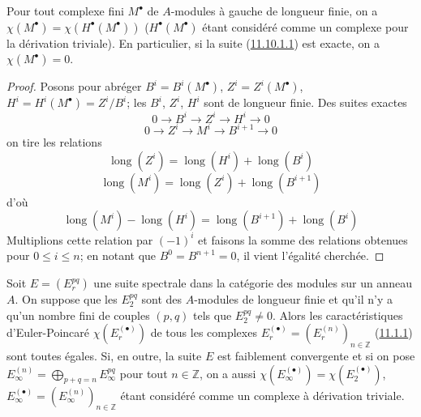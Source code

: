 \begin{proposition}[11.10.2]
\label{0.11.10.2-fr}
Pour tout complexe fini $M^\bullet$ de $A$-modules à gauche de longueur
finie, on a $\chi(M^\bullet)=\chi(H^\bullet(M^\bullet))$
($H^\bullet(M^\bullet)$ étant considéré comme un complexe pour la dérivation
triviale). En particulier, si la suite
(\hyperref[0.11.10.1.1-fr]{11.10.1.1}) est exacte, on a
$\chi(M^\bullet)=0$.
\end{proposition}

\begin{proof}
Posons pour abréger $B^i=B^i(M^\bullet)$, $Z^i=Z^i(M^\bullet)$,
$H^i=H^i(M^\bullet)=Z^i/B^i$; les $B^i$, $Z^i$, $H^i$ sont de longueur
finie. Des suites exactes
\[
0\longrightarrow B^i\longrightarrow Z^i\longrightarrow H^i
\longrightarrow0
\]
\[
0\longrightarrow Z^i\longrightarrow M^i\longrightarrow B^{i+1}
\longrightarrow0
\]
on tire les relations
\[
\operatorname{long}(Z^i)=\operatorname{long}(H^i)+
\operatorname{long}(B^i)
\]
\[
\operatorname{long}(M^i)=\operatorname{long}(Z^i)+
\operatorname{long}(B^{i+1})
\]
d'où
\[
\operatorname{long}(M^i)-\operatorname{long}(H^i)=
\operatorname{long}(B^{i+1})+\operatorname{long}(B^i)
\]
Multiplions cette relation par $(-1)^i$ et faisons la somme des relations
obtenues pour $0\leq i\leq n$; en notant que
$B^0=B^{n+1}=0$, il vient l'égalité cherchée.
\end{proof}

\begin{corollary}[11.10.3]
\label{0.11.10.3-fr}
Soit $E=(E_r^{pq})$ une suite spectrale dans la catégorie des modules sur un
anneau $A$. On suppose que les $E_2^{pq}$ sont des $A$-modules de longueur
finie et qu'il n'y a qu'un nombre fini de couples $(p,q)$ tels que
$E_2^{pq}\neq0$. Alors les caractéristiques d'Euler-Poincaré
$\chi(E_r^{(\bullet)})$ de tous les complexes
$E_r^{(\bullet)}=(E_r^{(n)})_{n\in\mathbb Z}$
(\hyperref[0.11.1.1-fr]{11.1.1}) sont toutes égales. Si, en outre, la suite
$E$ est faiblement convergente et si on pose
$E_\infty^{(n)}=\bigoplus_{p+q=n}E_\infty^{pq}$ pour tout $n\in\mathbb Z$,
on a aussi $\chi(E_\infty^{(\bullet)})=\chi(E_2^{(\bullet)})$,
$E_\infty^{(\bullet)}=(E_\infty^{(n)})_{n\in\mathbb Z}$ étant considéré comme
un complexe à dérivation triviale.
\end{corollary}

